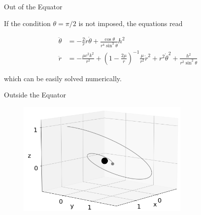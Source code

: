\documentclass[xcolor=dvipsnames]{beamer}
\begin{document}
\begin{frame}{Out of the Equator}

If the condition $\theta = \pi/2$ is not imposed, the equations read

\begin{block}{}
\begin{align*}
\ddot{\theta} &= -\frac{2}{r} \dot{r} \dot{\theta} + \frac{\cos \theta}{r^4 \sin^3 \theta} h^2  \\
\ddot{r} &= -\frac{\mu c^2 k^2}{r^2} + \left( 1 - \frac{2\mu}{r}\right)^{-1} \frac{\mu}{r^2}\dot{r}^2 + r^2 \dot{\theta}^2 + \frac{h^2}{r^2 \sin^2 \theta} 
\end{align*}
\end{block}

which can be easily solved numerically.

\end{frame}



\begin{frame}{Outside the Equator}

\begin{figure}[h!]
   \centering
   \includegraphics[width=0.75\textwidth]{Presentations/Images/2_gen_obit1.png}
\end{figure}

\end{frame}
\end{document}
